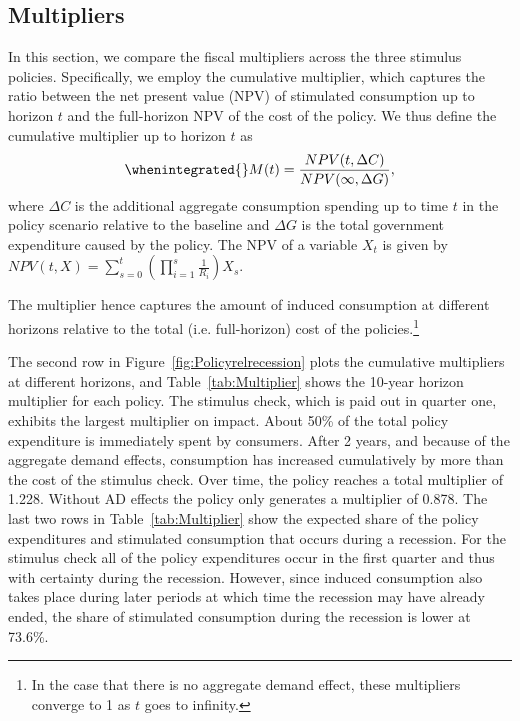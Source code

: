 \documentclass[\latexroot/\projectname]{subfiles}
\begin{document}
\subsection{Multipliers}
\whenintegrated{\label{sec:multipliers}} %

In this section, we compare the fiscal multipliers across the three stimulus policies.
Specifically, we employ the cumulative multiplier, which captures the ratio between the net present value (NPV) of stimulated consumption up to horizon $t$ and the full-horizon NPV of the cost of the policy.
We thus define the cumulative multiplier up to horizon $t$ as
\begin{equation}
  \whenintegrated{\label{eqn:cumMultiplier}} %
  M(t) = \frac{NPV(t,\Delta C)}{NPV (\infty,\Delta G)},
\end{equation}
where $\Delta C$ is the additional aggregate consumption spending up to time $t$ in the policy scenario relative to the baseline and $\Delta G$ is the total government expenditure caused by the policy.
The NPV of a variable $X_t$ is given by
$NPV(t,X) = \sum_{s=0}^{t} \left( \prod_{i=1}^{s} \frac{1}{R_i} \right) X_s$.

The multiplier hence captures the amount of induced consumption at different horizons relative to the total (i.e.
full-horizon) cost of the policies.\footnote{In the case that there is no aggregate demand effect, these multipliers converge to 1 as $t$ goes to infinity.}

The second row in Figure~\ref{fig:Policyrelrecession} plots the cumulative multipliers at different horizons, and Table~\ref{tab:Multiplier} shows the 10-year horizon multiplier for each policy.
The stimulus check, which is paid out in quarter one, exhibits the largest multiplier on impact.
About 50\% of the total policy expenditure is immediately spent by consumers.
After 2 years, and because of the aggregate demand effects, consumption has increased cumulatively by more than the cost of the stimulus check.
Over time, the policy reaches a total multiplier of 1.228.
Without AD effects the policy only generates a multiplier of 0.878.
The last two rows in Table~\ref{tab:Multiplier} show the expected share of the policy expenditures and stimulated consumption that occurs during a recession.
For the stimulus check all of the policy expenditures occur in the first quarter and thus with certainty during the recession.
However, since induced consumption also takes place during later periods at which time the recession may have already ended, the share of stimulated consumption during the recession is lower at 73.6\%.
\end{document}
